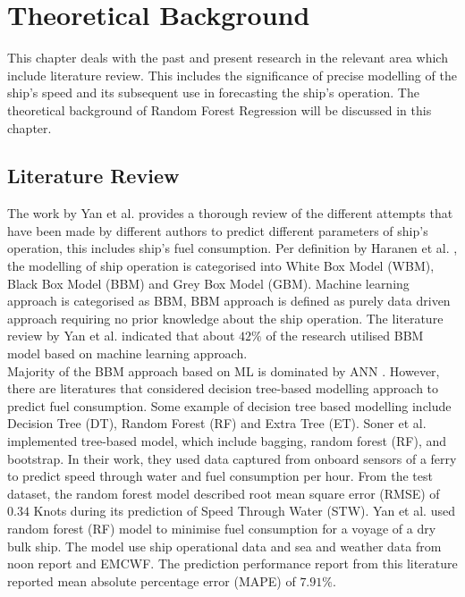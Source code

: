 \section{Theoretical Background} \label{theory}

This chapter deals with the past and present research in the relevant area which include literature review. This includes 
the significance of precise modelling of the ship's speed and its subsequent use in forecasting the ship's operation.
The theoretical background of Random Forest Regression will be discussed in this chapter. 

\subsection{Literature Review}\label{litreview}

The work by Yan et al. \cite{Yan.2021} provides a thorough review of the different attempts that have been made by different authors  to predict different parameters of ship's operation, this includes ship's fuel consumption. Per definition by Haranen et al. \cite{MichaelHaranen.2016}, the modelling of ship operation is categorised into White Box Model (WBM), Black Box Model (BBM) and Grey Box Model (GBM). Machine learning approach is categorised as BBM, BBM approach is defined as purely data driven approach requiring no prior knowledge about the ship operation. The literature review by Yan et al. \cite{Yan.2021} indicated that about $42\%$ of the research utilised BBM model based on machine learning approach.\\ 

Majority of the BBM approach based on ML is dominated by ANN \cite{Yan.2021}. However, there are literatures that considered decision tree-based modelling approach to predict fuel consumption. Some example of decision tree based modelling include Decision Tree (DT), Random Forest (RF) and Extra Tree (ET). Soner et al. \cite{Soner.2018} implemented tree-based model, which include bagging, random forest (RF), and bootstrap. In their work, they used data captured from onboard sensors of a ferry to predict speed through water and fuel consumption per hour. From the test dataset, the random forest model described root mean square error (RMSE) of $0.34$ Knots during its prediction of Speed Through Water (STW). Yan et al. \cite{Yan.2020} used random forest (RF) model to minimise fuel consumption for a voyage of a dry bulk ship. The model use ship operational data and sea and weather data from noon report and EMCWF. The prediction performance report from this literature reported mean absolute percentage error (MAPE) of $7.91\%$.\\      

